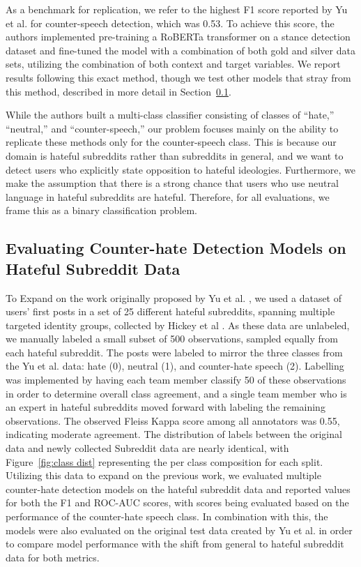 \documentclass[10pt,twocolumn,letterpaper]{article}
\begin{document}
As a benchmark for replication, we refer to the highest F1 score reported by Yu et al. \cite{yu-etal-2022-hate} for counter-speech detection, which was 0.53. To achieve this score, the authors implemented pre-training a RoBERTa transformer \cite{liu2019roberta} on a stance detection dataset \cite{pougue2021debagreement} and fine-tuned the model with a combination of both gold and silver data sets, utilizing the combination of both context and target variables. We report results following this exact method, though we test other models that stray from this method, described in more detail in Section~\ref{sec:evaluation}.

While the authors built a multi-class classifier consisting of classes of ``hate,'' ``neutral,'' and ``counter-speech,''  our problem focuses mainly on the ability to replicate these methods only for the counter-speech class. This is because our domain is hateful subreddits rather than subreddits in general, and we want to detect users who explicitly state opposition to hateful ideologies. Furthermore, we make the assumption that there is a strong chance that users who use neutral language in hateful subreddits are hateful. Therefore, for all evaluations, we frame this as a binary classification problem.


\subsection{Evaluating Counter-hate Detection Models on Hateful Subreddit Data}\label{sec:evaluation}
To Expand on the work originally proposed by Yu et al. \cite{yu-etal-2022-hate}, we used a dataset of users' first posts in a set of 25 different hateful subreddits, spanning multiple targeted identity groups, collected by Hickey et al \cite{hickey2023reddit}. As these data are unlabeled, we manually labeled a small subset of 500 observations, sampled equally from each hateful subreddit. The posts were labeled to mirror the three classes from the Yu et al. data: hate (0), neutral (1), and counter-hate speech (2). Labelling was implemented by having each team member classify 50 of these observations in order to determine overall class agreement, and a single team member who is an expert in hateful subreddits moved forward with labeling the remaining observations. The observed Fleiss Kappa score among all annotators was 0.55, indicating moderate agreement. The distribution of labels between the original data and newly collected Subreddit data are nearly identical, with Figure~\ref{fig:class dist} representing the per class composition for each split. Utilizing this data to expand on the previous work, we evaluated multiple counter-hate detection models on the hateful subreddit data and reported values for both the F1 and ROC-AUC scores, with scores being evaluated based on the performance of the counter-hate speech class. In combination with this, the models were also evaluated on the original test data created by Yu et al. \cite{yu-etal-2022-hate} in order to compare model performance with the shift from general to hateful subreddit data for both metrics. 
\end{document}
